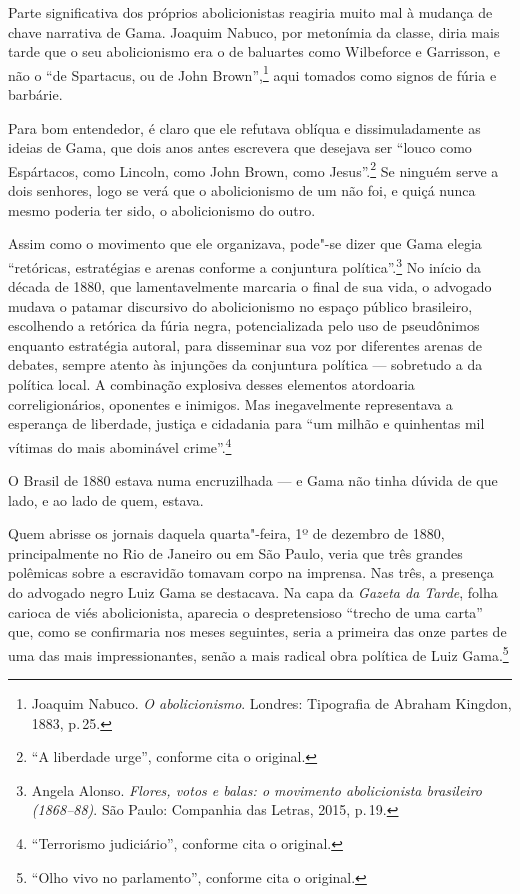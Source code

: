 \begin{multicols}{2}
Parte significativa dos próprios abolicionistas reagiria muito mal à mudança de chave narrativa de Gama. Joaquim Nabuco, por metonímia da classe, diria mais tarde que o seu abolicionismo era o de baluartes como Wilbeforce e Garrisson, e não o “de Spartacus, ou de John Brown”,\footnote{Joaquim Nabuco. \textit{O abolicionismo}. Londres: Tipografia de Abraham Kingdon, 1883, p.\,25.} aqui tomados como signos de fúria e barbárie.

Para bom entendedor, é claro que ele refutava oblíqua e dissimuladamente as ideias de Gama, que dois anos antes escrevera que desejava ser ``louco como Espártacos, como Lincoln, como John Brown, como Jesus''.\footnote{``A liberdade urge'', conforme cita o original.} Se ninguém serve a dois senhores, logo se verá que o abolicionismo de um não foi, e quiçá nunca mesmo poderia ter sido, o abolicionismo do outro.

Assim como o movimento que ele organizava, pode"-se dizer que Gama elegia ``retóricas, estratégias e arenas conforme a conjuntura política''.\footnote{Angela Alonso. \textit{Flores, votos e balas: o movimento abolicionista brasileiro (1868--88)}. São Paulo: Companhia das Letras, 2015, p.\,19.} No início da década de 1880, que lamentavelmente marcaria o final de sua vida, o advogado  mudava o patamar discursivo do abolicionismo no espaço público brasileiro, escolhendo a retórica da fúria negra, potencializada pelo uso de pseudônimos enquanto estratégia autoral, para disseminar sua voz por diferentes arenas de debates, sempre atento às injunções da conjuntura política --- sobretudo a da política local. A combinação explosiva desses elementos atordoaria correligionários, oponentes e inimigos. Mas inegavelmente representava a esperança de liberdade, justiça e cidadania para ``um milhão e quinhentas mil vítimas do mais abominável crime''.\footnote{``Terrorismo judiciário'', conforme cita o original.}

O Brasil de 1880 estava numa encruzilhada --- e Gama não tinha dúvida de que lado, e ao lado de quem, estava.

Quem abrisse os jornais daquela quarta"-feira, 1º de dezembro de 1880, principalmente no Rio de Janeiro ou em São Paulo, veria que três grandes polêmicas sobre a escravidão tomavam corpo na imprensa. Nas três, a presença do advogado negro Luiz Gama se destacava. Na capa da \textit{Gazeta da Tarde}, folha carioca de viés abolicionista, aparecia o despretensioso ``trecho de uma carta'' que, como se confirmaria nos meses seguintes, seria a primeira das onze partes de uma das mais impressionantes, senão a mais radical obra política de Luiz Gama.\footnote{``Olho vivo no parlamento'', conforme cita o original.} 


\end{multicols}
